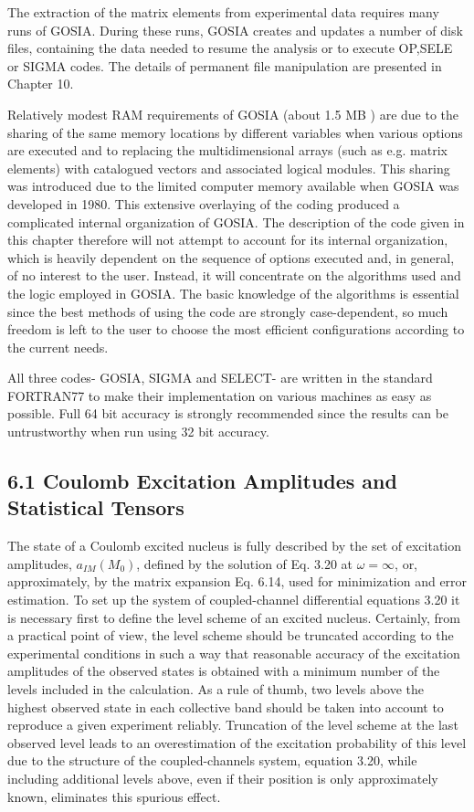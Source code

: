 \documentclass[10pt]{article}
\begin{document}
The extraction of the matrix elements from experimental data requires many runs of GOSIA. During these runs, GOSIA creates and updates a number of disk files, containing the data needed to resume the analysis or to execute OP,SELE or SIGMA codes. The details of permanent file manipulation are presented in Chapter 10.

Relatively modest RAM requirements of GOSIA (about 1.5 MB ) are due to the sharing of the same memory locations by different variables when various options are executed and to replacing the multidimensional arrays (such as e.g. matrix elements) with catalogued vectors and associated logical modules. This sharing was introduced due to the limited computer memory available when GOSIA was developed in 1980. This extensive overlaying of the coding produced a complicated internal organization of GOSIA. The description of the code given in this chapter therefore will not attempt to account for its internal organization, which is heavily dependent on the sequence of options executed and, in general, of no interest to the user. Instead, it will concentrate on the algorithms used and the logic employed in GOSIA. The basic knowledge of the algorithms is essential since the best methods of using the code are strongly case-dependent, so much freedom is left to the user to choose the most efficient configurations according to the current needs.

All three codes- GOSIA, SIGMA and SELECT- are written in the standard FORTRAN77 to make their implementation on various machines as easy as possible. Full 64 bit accuracy is strongly recommended since the results can be untrustworthy when run using 32 bit accuracy.

\subsection*{6.1 Coulomb Excitation Amplitudes and Statistical Tensors}
The state of a Coulomb excited nucleus is fully described by the set of excitation amplitudes, $a_{I M}\left(M_{0}\right)$, defined by the solution of Eq. 3.20 at $\omega=\infty$, or, approximately, by the matrix expansion Eq. 6.14, used for minimization and error estimation. To set up the system of coupled-channel differential equations 3.20 it is necessary first to define the level scheme of an excited nucleus. Certainly, from a practical point of view, the level scheme should be truncated according to the experimental conditions in such a way that reasonable accuracy of the excitation amplitudes of the observed states is obtained with a minimum number of the levels included in the calculation. As a rule of thumb, two levels above the highest observed state in each collective band should be taken into account to reproduce a given experiment reliably. Truncation of the level scheme at the last observed level leads to an overestimation of the excitation probability of this level due to the structure of the coupled-channels system, equation 3.20, while including additional levels above, even if their position is only approximately known, eliminates this spurious effect.
\end{document}
